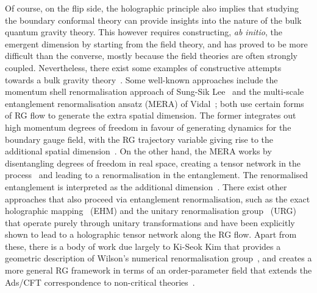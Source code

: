 Of course, on the flip side, the holographic principle also implies that studying the boundary conformal theory can provide insights into the nature of the bulk quantum gravity theory.
This however requires constructing, {\it ab initio}, the emergent dimension by starting from the field theory, and has proved to be more difficult than the converse, mostly because the field theories are often strongly coupled.
Nevertheless, there exist some examples of constructive attempts towards a bulk gravity theory~\cite{matsueda_2012_kondo,matsueda2013,matsueda_2013_fisherinformation,matsueda_2014,czech_2018,Faulkner2017,Faulkner2014,gu_2016,wen_2016,leigh_2015,leigh_2014,douglas_2011,koch_2011,lee2010,lee_2010_lectures,Lee2012,lee2014,vidal2007,vidal2008,swingle2012a,evenbly_2014,milsted_2018,evenbly2011,reyes_2020,McMahon2020,qi2013,lee2016,anirbanurg1,anirbanurg2,Mukherjee_mott_merg,kim2019,kim_2017_supeconductor,kim_2016,kim_2020,kim_2020_geometric,kim_2020_NPB,kim_2020_dirac,Kim2021}. Some well-known approaches include the momentum shell renormalisation approach of Sung-Sik Lee~\cite{lee2010,lee_2010_lectures,Lee2012,lee2014} and the multi-scale entanglement renormalisation ansatz (MERA) of Vidal~\cite{vidal2007,vidal2008,swingle2012a,evenbly_2014,milsted_2018}; both use certain forms of RG flow to generate the extra spatial dimension.
The former integrates out high momentum degrees of freedom in favour of generating dynamics for the boundary gauge field, with the RG trajectory variable giving rise to the additional spatial dimension~\cite{green_holography_2013}.
On the other hand, the MERA works by disentangling degrees of freedom in real space, creating a tensor network in the process~\cite{evenbly2011,reyes_2020,McMahon2020} and leading to a renormalisation in the entanglement.
The renormalised entanglement is interpreted as the additional dimension~\cite{swingle2012a}.
There exist other approaches that also proceed via entanglement renormalisation, such as the exact holographic mapping~\cite{qi2013,lee2016} (EHM) and the unitary renormalisation group~\cite{anirbanurg1,anirbanurg2,Mukherjee_mott_merg} (URG) that operate purely through unitary transformations and have been explicitly shown to lead to a holographic tensor network along the RG flow.
Apart from these, there is a body of work due largely to Ki-Seok Kim that provides a geometric description of Wilson's numerical renormalisation group~\cite{wilson1975,hrk_wilson_1980,kim2019,kim_2017_supeconductor,kim_2016}, and creates a more general RG framework in terms of an order-parameter field  that extends the Ads/CFT correspondence to non-critical theories~\cite{kim_2020,kim_2020_geometric,kim_2020_NPB,kim_2020_dirac,Kim2021}.

